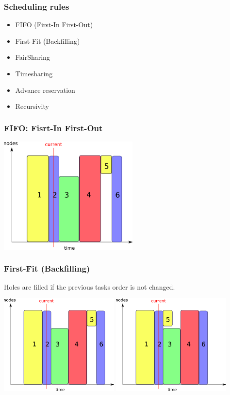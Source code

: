 \documentclass{beamer}
\begin{document}
\begin{frame}
	\frametitle{Scheduling rules}
		\begin{itemize}
		\item FIFO (First-In First-Out)
		\item First-Fit (Backfilling)
		\item FairSharing
		\item Timesharing
		\item Advance reservation
		\item Recursivity
	\end{itemize}

\end{frame}

\begin{frame}
	\frametitle{FIFO: Fisrt-In First-Out}
	\begin{center}
		\includegraphics[width=7cm]{fifo.png}
	\end{center}

\end{frame}

\begin{frame}
	\frametitle{ First-Fit (Backfilling)}
        Holes are filled if the previous tasks order is not changed.
	\begin{center}
			\includegraphics[width=6cm]{fifo.png}
		\includegraphics[width=6cm]{cbf.png}
	\end{center}

\end{frame}
\end{document}
